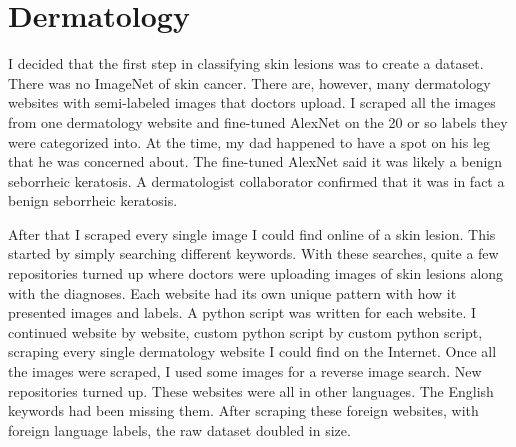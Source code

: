 \section{Dermatology}


I decided that the first step in classifying skin lesions was to create a dataset.  There was no ImageNet of skin cancer.  There are, however, many dermatology websites with semi-labeled images that doctors upload.  I scraped all the images from one dermatology website and fine-tuned AlexNet on the 20 or so labels they were categorized into.  At the time, my dad happened to have a spot on his leg that he was concerned about.  The fine-tuned AlexNet said it was likely a benign seborrheic keratosis.  A dermatologist collaborator confirmed that it was in fact a benign seborrheic keratosis.

After that I scraped every single image I could find online of a skin lesion.  This started by simply searching different keywords.  With these searches, quite a few repositories turned up where doctors were uploading images of skin lesions along with the diagnoses.  Each website had its own unique pattern with how it presented images and labels.  A python script was written for each website.  I continued website by website, custom python script by custom python script, scraping every single dermatology website I could find on the Internet.  Once all the images were scraped, I used some images for a reverse image search.  New repositories turned up.  These websites were all in other languages. The English keywords had been missing them.  After scraping these foreign websites, with foreign language labels, the raw dataset doubled in size.

